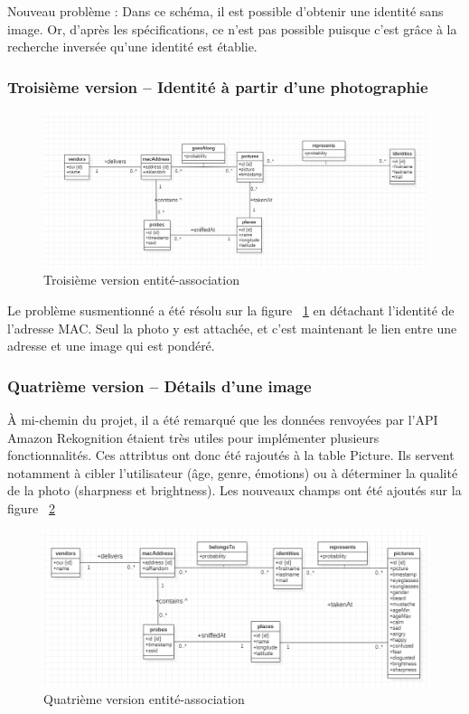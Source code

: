 Nouveau problème : Dans ce schéma, il est possible d’obtenir une identité sans image. Or, d’après les
spécifications, ce n’est pas possible puisque c’est grâce à la recherche inversée qu’une identité est établie.

\subsubsection{Troisième version – Identité à partir d’une photographie}

\begin{figure}[H]
	\centering
	\includegraphics[width=12cm]{images/proto-3.png}
	\caption{Troisième version entité-association}
	\label{fig:model-ea-3}
\end{figure}

Le problème susmentionné a été résolu sur la figure ~\ref{fig:model-ea-3} en détachant l’identité de l’adresse MAC. Seul la photo y est attachée, et
c’est maintenant le lien entre une adresse et une image qui est pondéré.

\subsubsection{Quatrième version – Détails d'une image}

À mi-chemin du projet, il a été remarqué que les données renvoyées par l'API Amazon Rekognition étaient très utiles 
pour implémenter plusieurs fonctionnalités. Ces attribtus ont donc été rajoutés à la table Picture.
Ils servent notamment à cibler l'utilisateur (âge, genre, émotions) ou à déterminer la qualité de la photo (sharpness et brightness).
Les nouveaux champs ont été ajoutés sur la figure ~\ref{fig:model-ea-4}

\begin{figure}[H]
	\centering
	\includegraphics[width=12cm]{images/database_4.png}
	\caption{Quatrième version entité-association}
	\label{fig:model-ea-4}
\end{figure}

